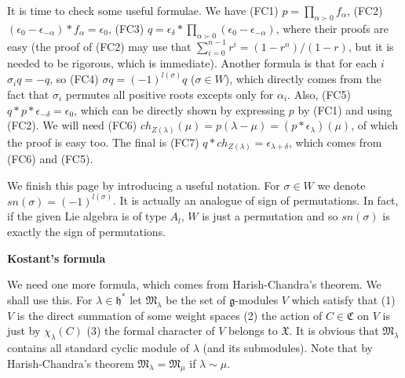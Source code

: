 \documentclass{article}
\newcommand{\lie}[1]{\mathfrak{#1}}
\begin{document}
It is time to check some useful formulae.
We have (FC1) $p = \prod_{\alpha \succ 0} f_\alpha$, (FC2) $(\epsilon_0 - \epsilon_{-\alpha}) * f_\alpha = \epsilon_0$, (FC3) $q = \epsilon_\delta * \prod_{\alpha \succ 0} (\epsilon_0 - \epsilon_{-\alpha})$, where their proofs are easy (the proof of (FC2) may use that $\sum_{i = 0}^{n - 1} r^i = (1 - r^n) / (1 - r)$, but it is needed to be rigorous, which is immediate).
Another formula is that for each $i$ $\sigma_i q = -q$, so (FC4) $\sigma q = (-1)^{l(\sigma)} q$ ($\sigma \in W$), which directly comes from the fact that $\sigma_i$ permutes all positive roots excepts only for $\alpha_i$.
Also, (FC5) $q * p * \epsilon_{-\delta} = \epsilon_0$, which can be directly shown by expressing $p$ by (FC1) and using (FC2).
We will need (FC6) $ch_{Z(\lambda)}(\mu) = p(\lambda - \mu) = (p * \epsilon_\lambda)(\mu)$, of which the proof is easy too.
The final is (FC7) $q * ch_{Z(\lambda)} = \epsilon_{\lambda + \delta}$, which comes from (FC6) and (FC5).

We finish this page by introducing a useful notation.
For $\sigma \in W$ we denote $sn(\sigma) = (-1)^{l(\sigma)}$.
It is actually an analogue of sign of permutations.
In fact, if the given Lie algebra is of type $A_l$, $W$ is just a permutation and so $sn(\sigma)$ is exactly the sign of permutations.

\newpage

\textbf{Kostant's formula}

We need one more formula, which comes from Harish-Chandra's theorem.
We shall use this.
For $\lambda \in \lie{h}^*$ let $\mathfrak{M}_\lambda$ be the set of $\lie{g}$-modules $V$ which satisfy that (1) $V$ is the direct summation of some weight spaces (2) the action of $C \in \mathfrak{C}$ on $V$ is just by $\chi_\lambda(C)$ (3) the formal character of $V$ belongs to $\mathfrak{X}$.
It is obvious that $\mathfrak{M}_\lambda$ contains all standard cyclic module of $\lambda$ (and its submodules).
Note that by Harish-Chandra's theorem $\mathfrak{M}_\lambda = \mathfrak{M}_\mu$ if $\lambda \sim \mu$.
\end{document}
